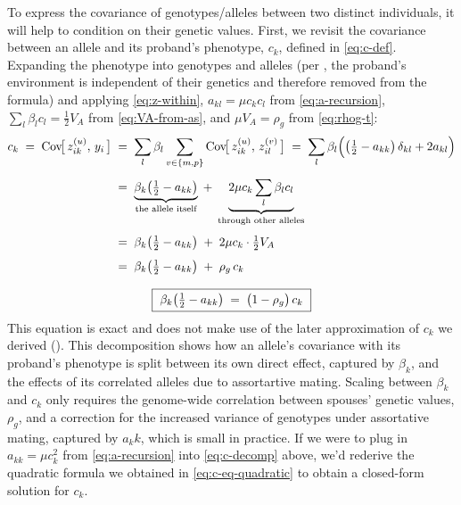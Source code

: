 \documentclass[12pt]{article}
\begin{document}
To express the covariance of genotypes/alleles between two distinct individuals, it will help to condition on their genetic values.
First, we revisit the covariance between an allele and its proband's phenotype, $c_k$, defined in \eqref{eq:c-def}.
Expanding the phenotype into genotypes and alleles (per , the proband's environment is independent of their genetics and therefore removed from the formula) and applying \eqref{eq:z-within}, $a_{kl} = \mu c_k c_l$ from \eqref{eq:a-recursion}, $\sum_l \beta_l c_l = \tfrac12 V_A$ from \eqref{eq:VA-from-as}, and $\mu V_A = \rho_g$ from \eqref{eq:rhog-t}:
\begin{equation}\label{eq:c-decomp}
\begin{gathered}
\begin{aligned}
    c_k \;=\; \mathrm{Cov}\!\big[\,z^{(u)}_{ik},\, y_i\,\big]
    \;&=\; \sum_l \beta_l \sum_{v \in \{m,p\}} \mathrm{Cov}\!\big[\,z^{(u)}_{ik},\, z^{(v)}_{il}\,\big]
    \;=\; \sum_l \beta_l \Big(\big(\tfrac12 - a_{kk}\big)\,\delta_{kl} + 2a_{kl}\Big) \\[4pt]
    \;&=\; \underbrace{\beta_k\big(\tfrac12 - a_{kk}\big)}_{\text{the allele itself}} \;+\; \underbrace{2\mu c_k \sum_l \beta_l c_l}_{\text{through other alleles}} \\[4pt]
    \;&=\; \beta_k\big(\tfrac12 - a_{kk}\big) \;+\; 2\mu c_k \cdot \tfrac12 V_A \\[4pt]
    \;&=\; \beta_k\big(\tfrac12 - a_{kk}\big) \;+\; \rho_g\, c_k
\end{aligned} \\[8pt]
    \boxed{\ \beta_k\big(\tfrac12 - a_{kk}\big) \;=\; \big(1-\rho_g\big)\, c_k \ }
\end{gathered}
\end{equation}
This equation is exact and does not make use of the later approximation of $c_k$ we derived ().
This decomposition shows how an allele's covariance with its proband's phenotype is split between its own direct effect, captured by $\beta_k$, and the effects of its correlated alleles due to assortartive mating.
Scaling between $\beta_k$ and $c_k$ only requires the genome-wide correlation between spouses' genetic values, $\rho_g$, and a correction for the increased variance of genotypes under assortative mating, captured by $a_kk$, which is small in practice.
If we were to plug in $a_{kk} = \mu c_k^2$ from \eqref{eq:a-recursion} into \eqref{eq:c-decomp} above, we'd rederive the quadratic formula we obtained in \eqref{eq:c-eq-quadratic} to obtain a closed-form solution for $c_k$.
\end{document}
